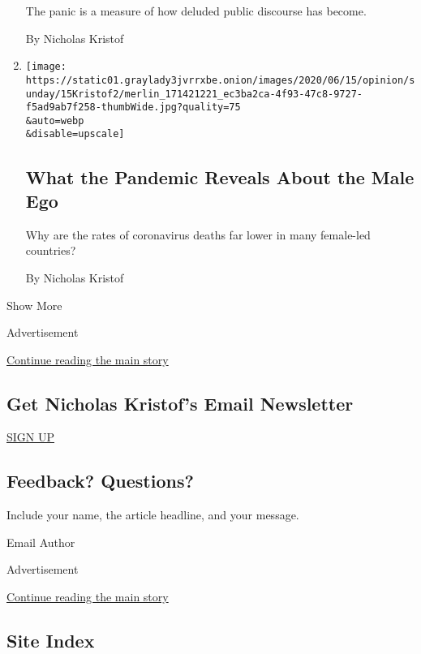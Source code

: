 \begin{enumerate}
  The panic is a measure of how deluded public discourse has become.

  By Nicholas Kristof
\item
  \href{/2020/06/13/opinion/sunday/women-leaders-coronavirus.html}{}

  \texttt{[image: https://static01.graylady3jvrrxbe.onion/images/2020/06/15/opinion/sunday/15Kristof2/merlin\_171421221\_ec3ba2ca-4f93-47c8-9727-f5ad9ab7f258-thumbWide.jpg?quality=75\\\&auto=webp\\\&disable=upscale]}

  \hypertarget{what-the-pandemic-reveals-about-the-male-ego}{%
  \subsection{What the Pandemic Reveals About the Male
  Ego}\label{what-the-pandemic-reveals-about-the-male-ego}}

  Why are the rates of coronavirus deaths far lower in many female-led
  countries?

  By Nicholas Kristof
\end{enumerate}

Show More

Advertisement

\protect\hyperlink{after-mid1}{Continue reading the main story}

\hypertarget{get-nicholas-kristofs-email-newsletter}{%
\subsection{Get Nicholas Kristof's Email
Newsletter}\label{get-nicholas-kristofs-email-newsletter}}

\href{/newsletters/signup/NK}{SIGN UP}

\hypertarget{feedback-questions}{%
\subsection{Feedback? Questions?}\label{feedback-questions}}

Include your name, the article headline, and your message.

Email Author

Advertisement

\protect\hyperlink{after-mktg}{Continue reading the main story}

\hypertarget{site-index}{%
\subsection{Site Index}\label{site-index}}

